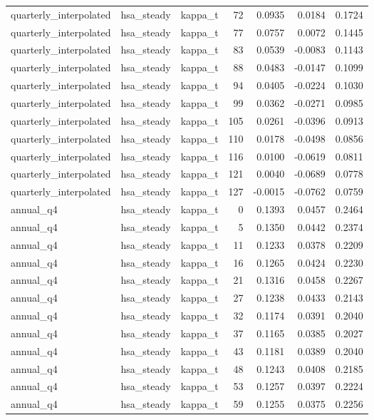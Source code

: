 \begin{tabular}{lllrrrr}
quarterly\_interpolated & hsa\_steady & kappa\_t & 72 & 0.0935 & 0.0184 & 0.1724 \\
quarterly\_interpolated & hsa\_steady & kappa\_t & 77 & 0.0757 & 0.0072 & 0.1445 \\
quarterly\_interpolated & hsa\_steady & kappa\_t & 83 & 0.0539 & -0.0083 & 0.1143 \\
quarterly\_interpolated & hsa\_steady & kappa\_t & 88 & 0.0483 & -0.0147 & 0.1099 \\
quarterly\_interpolated & hsa\_steady & kappa\_t & 94 & 0.0405 & -0.0224 & 0.1030 \\
quarterly\_interpolated & hsa\_steady & kappa\_t & 99 & 0.0362 & -0.0271 & 0.0985 \\
quarterly\_interpolated & hsa\_steady & kappa\_t & 105 & 0.0261 & -0.0396 & 0.0913 \\
quarterly\_interpolated & hsa\_steady & kappa\_t & 110 & 0.0178 & -0.0498 & 0.0856 \\
quarterly\_interpolated & hsa\_steady & kappa\_t & 116 & 0.0100 & -0.0619 & 0.0811 \\
quarterly\_interpolated & hsa\_steady & kappa\_t & 121 & 0.0040 & -0.0689 & 0.0778 \\
quarterly\_interpolated & hsa\_steady & kappa\_t & 127 & -0.0015 & -0.0762 & 0.0759 \\
annual\_q4 & hsa\_steady & kappa\_t & 0 & 0.1393 & 0.0457 & 0.2464 \\
annual\_q4 & hsa\_steady & kappa\_t & 5 & 0.1350 & 0.0442 & 0.2374 \\
annual\_q4 & hsa\_steady & kappa\_t & 11 & 0.1233 & 0.0378 & 0.2209 \\
annual\_q4 & hsa\_steady & kappa\_t & 16 & 0.1265 & 0.0424 & 0.2230 \\
annual\_q4 & hsa\_steady & kappa\_t & 21 & 0.1316 & 0.0458 & 0.2267 \\
annual\_q4 & hsa\_steady & kappa\_t & 27 & 0.1238 & 0.0433 & 0.2143 \\
annual\_q4 & hsa\_steady & kappa\_t & 32 & 0.1174 & 0.0391 & 0.2040 \\
annual\_q4 & hsa\_steady & kappa\_t & 37 & 0.1165 & 0.0385 & 0.2027 \\
annual\_q4 & hsa\_steady & kappa\_t & 43 & 0.1181 & 0.0389 & 0.2040 \\
annual\_q4 & hsa\_steady & kappa\_t & 48 & 0.1243 & 0.0408 & 0.2185 \\
annual\_q4 & hsa\_steady & kappa\_t & 53 & 0.1257 & 0.0397 & 0.2224 \\
annual\_q4 & hsa\_steady & kappa\_t & 59 & 0.1255 & 0.0375 & 0.2256 \\

\end{tabular}
